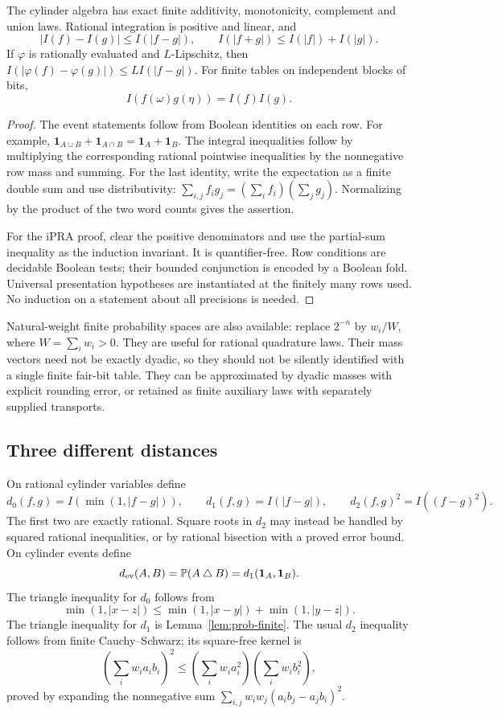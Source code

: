 \begin{lemma}\label{lem:prob-finite}
The cylinder algebra has exact finite additivity, monotonicity, complement
and union laws. Rational integration is positive and linear, and
\[
 |I(f)-I(g)|\le I(|f-g|),\qquad
 I(|f+g|)\le I(|f|)+I(|g|).
\]
If $\varphi$ is rationally evaluated and $L$-Lipschitz, then
$I(|\varphi(f)-\varphi(g)|)\le L I(|f-g|)$.
For finite tables on independent blocks of bits,
\[
 I(f(\omega)g(\eta))=I(f)I(g).
\]
\end{lemma}
\begin{proof}
The event statements follow from Boolean identities on each row. For example,
$\mathbf1_{A\cup B}+\mathbf1_{A\cap B}=\mathbf1_A+\mathbf1_B$.
The integral inequalities follow by multiplying the corresponding rational
pointwise inequalities by the nonnegative row mass and summing. For the last
identity, write the expectation as a finite double sum and use distributivity:
$\sum_{i,j}f_i g_j=(\sum_i f_i)(\sum_j g_j)$. Normalizing by the product of
the two word counts gives the assertion.

For the iPRA proof, clear the positive denominators and use the partial-sum
inequality as the induction invariant. It is quantifier-free. Row conditions
are decidable Boolean tests; their bounded conjunction is encoded by a Boolean
fold. Universal presentation hypotheses are instantiated at the finitely many
rows used. No induction on a statement about all precisions is needed.
\end{proof}

Natural-weight finite probability spaces are also available: replace
$2^{-n}$ by $w_i/W$, where $W=\sum_iw_i>0$. They are useful for rational
quadrature laws. Their mass vectors need not be exactly dyadic, so they should
not be silently identified with a single finite fair-bit table. They can be
approximated by dyadic masses with explicit rounding error, or retained as
finite auxiliary laws with separately supplied transports.

\subsection{Three different distances}

On rational cylinder variables define
\[
 d_0(f,g)=I(\min(1,|f-g|)),\qquad
 d_1(f,g)=I(|f-g|),\qquad
 d_2(f,g)^2=I((f-g)^2).
\]
The first two are exactly rational. Square roots in $d_2$ may instead be
handled by squared rational inequalities, or by rational bisection with a
proved error bound. On cylinder events define
\[
 d_{\rm ev}(A,B)=\mathbb P(A\mathbin{\triangle}B)
                =d_1(\mathbf1_A,\mathbf1_B).
\]
The triangle inequality for $d_0$ follows from
\[
 \min(1,|x-z|)\le\min(1,|x-y|)+\min(1,|y-z|).
\]
The triangle inequality for $d_1$ is Lemma~\ref{lem:prob-finite}. The usual
$d_2$ inequality follows from finite Cauchy--Schwarz; its square-free kernel is
\[
 \left(\sum_i w_i a_i b_i\right)^2
 \le\left(\sum_iw_i a_i^2\right)\left(\sum_iw_i b_i^2\right),
\]
proved by expanding the nonnegative sum
$\sum_{i,j}w_iw_j(a_i b_j-a_j b_i)^2$.

